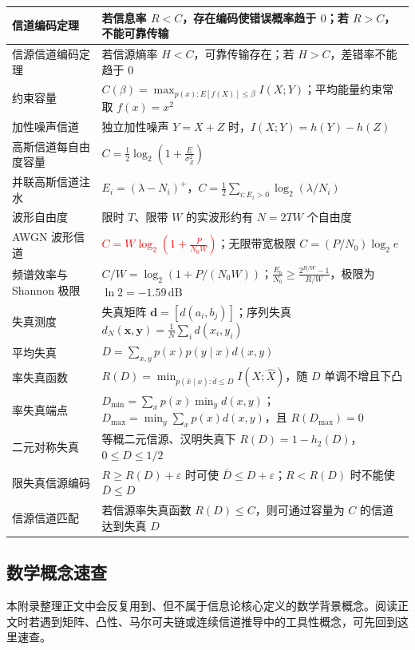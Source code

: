 {\begin{longtable}{@{}p{}p{}@{}}
\midrule
信道编码定理 & 若信息率 $R<C$，存在编码使错误概率趋于 $0$；若 $R>C$，不能可靠传输 \\
\midrule
信源信道编码定理 & 若信源熵率 $H<C$，可靠传输存在；若 $H>C$，差错率不能趋于 $0$ \\
\midrule
约束容量 & $C(\beta)=\max_{p(x):E[f(X)]\le\beta}I(X;Y)$；平均能量约束常取 $f(x)=x^2$ \\
\midrule
加性噪声信道 & 独立加性噪声 $Y=X+Z$ 时，$I(X;Y)=h(Y)-h(Z)$ \\
\midrule
高斯信道每自由度容量 & $C=\frac12\log_2\left(1+\frac{E}{\sigma_Z^2}\right)$ \\
\midrule
并联高斯信道注水 & $E_i=(\lambda-N_i)^+$，$C=\frac12\sum_{i:E_i>0}\log_2(\lambda/N_i)$ \\
\midrule
波形自由度 & 限时 $T$、限带 $W$ 的实波形约有 $N=2TW$ 个自由度 \\
\midrule
AWGN 波形信道 & \textcolor{Red}{$C=W\log_2\left(1+\frac{P}{N_0W}\right)$}；无限带宽极限 $C=(P/N_0)\log_2e$ \\
\midrule
频谱效率与 Shannon 极限 & $C/W=\log_2(1+P/(N_0W))$；$\frac{E_b}{N_0}\ge\frac{2^{R/W}-1}{R/W}$，极限为 $\ln2=-1.59\,\mathrm{dB}$ \\
\midrule
失真测度 & 失真矩阵 $\mathbf d=[d(a_i,b_j)]$；序列失真 $d_N(\mathbf x,\mathbf y)=\frac1N\sum_i d(x_i,y_i)$ \\
\midrule
平均失真 & $D=\sum_{x,y}p(x)p(y\mid x)d(x,y)$ \\
\midrule
率失真函数 & $R(D)=\min_{p(\hat x\mid x):\bar d\le D}I(X;\hat X)$，随 $D$ 单调不增且下凸 \\
\midrule
率失真端点 & $D_{\min}=\sum_xp(x)\min_y d(x,y)$；$D_{\max}=\min_y\sum_xp(x)d(x,y)$，且 $R(D_{\max})=0$ \\
\midrule
二元对称失真 & 等概二元信源、汉明失真下 $R(D)=1-h_2(D)$，$0\le D\le1/2$ \\
\midrule
限失真信源编码 & $R\ge R(D)+\varepsilon$ 时可使 $\bar D\le D+\varepsilon$；$R<R(D)$ 时不能使 $\bar D\le D$ \\
\midrule
信源信道匹配 & 若信源率失真函数 $R(D)\le C$，则可通过容量为 $C$ 的信道达到失真 $D$ \\
\end{longtable}
}

\subsection{数学概念速查}

本附录整理正文中会反复用到、但不属于信息论核心定义的数学背景概念。阅读正文时若遇到矩阵、凸性、马尔可夫链或连续信道推导中的工具性概念，可先回到这里速查。

